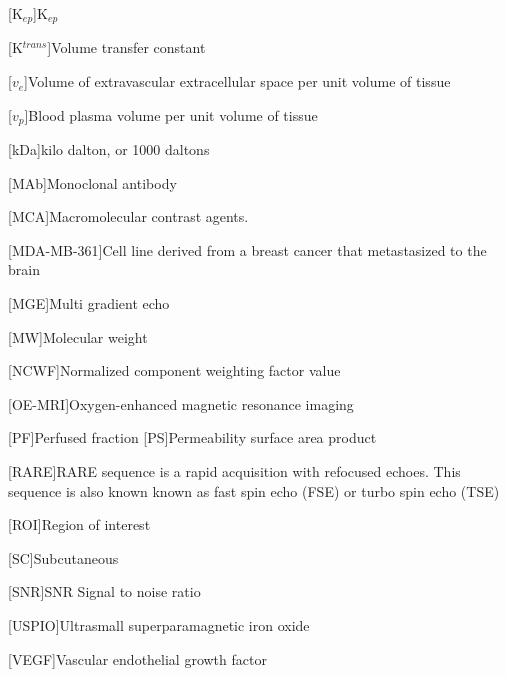 \begin{acronym}
[K$_{ep}$]{K$_{ep}$}

[K$^{trans}$]{Volume transfer constant}

[$v_e$]{Volume of extravascular extracellular space per unit volume of tissue}

[$v_p$]{Blood plasma volume per unit volume of tissue}

[kDa]{kilo dalton, or 1000 daltons}

[MAb]{Monoclonal antibody}

[MCA]{Macromolecular contrast agents.}

[MDA-MB-361]{Cell line derived from a breast cancer that metastasized to the brain}

[MGE]{Multi gradient echo}

[MW]{Molecular weight}

[NCWF]{Normalized component weighting factor value}

[OE-MRI]{Oxygen-enhanced magnetic resonance imaging}

[PF]{Perfused fraction}
[PS]{Permeability surface area product}

[RARE]{RARE sequence is a rapid acquisition with refocused echoes. This sequence is also known known as fast spin echo (FSE) or turbo spin echo (TSE)}

[ROI]{Region of interest}

[SC]{Subcutaneous}

[SNR]{SNR Signal to noise ratio}

[USPIO]{Ultrasmall superparamagnetic iron oxide}

[VEGF]{Vascular endothelial growth factor}


\end{acronym}

% 
